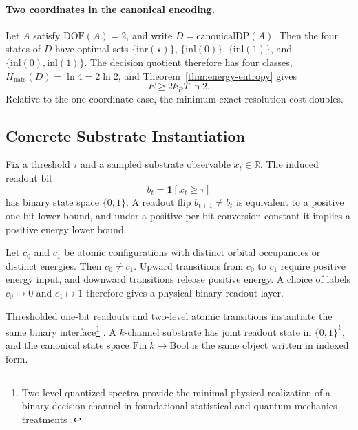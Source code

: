 \paragraph{Two coordinates in the canonical encoding.}
Let $A$ satisfy $\mathrm{DOF}(A)=2$, and write $D=\mathrm{canonicalDP}(A)$. Then the four states of $D$ have optimal sets $\{\mathrm{inr}(\star)\}$, $\{\mathrm{inl}(0)\}$, $\{\mathrm{inl}(1)\}$, and $\{\mathrm{inl}(0),\mathrm{inl}(1)\}$. The decision quotient therefore has four classes, $H_{\mathrm{nats}}(D)=\ln 4 = 2\ln 2$, and Theorem~\ref{thm:energy-entropy} gives
\[
E \ge 2 k_B T \ln 2.
\]
Relative to the one-coordinate case, the minimum exact-resolution cost doubles.

\subsection{Concrete Substrate Instantiation}

\begin{proposition}\label{prop:threshold-channel}
Fix a threshold $\tau$ and a sampled substrate observable $x_t \in \mathbb{R}$. The induced readout bit
\[
b_t = \mathbf{1}[x_t \ge \tau]
\]
has binary state space $\{0,1\}$. A readout flip $b_{t+1} \ne b_t$ is equivalent to a positive one-bit lower bound, and under a positive per-bit conversion constant it implies a positive energy lower bound.
\end{proposition}

\begin{proposition}\label{prop:atomic-realization}
Let $c_0$ and $c_1$ be atomic configurations with distinct orbital occupancies or distinct energies. Then $c_0 \ne c_1$. Upward transitions from $c_0$ to $c_1$ require positive energy input, and downward transitions release positive energy. A choice of labels $c_0 \mapsto 0$ and $c_1 \mapsto 1$ therefore gives a physical binary readout layer.
\end{proposition}

Thresholded one-bit readouts and two-level atomic transitions instantiate the same binary interface\footnote{Two-level quantized spectra provide the minimal physical realization of a binary decision channel in foundational statistical and quantum mechanics treatments \cite{planck1901distribution,dirac1930principles,sakurai2017modern}.} \cite{berut2012experimental}. A $k$-channel substrate has joint readout state in $\{0,1\}^k$, and the canonical state space $\mathrm{Fin}\;k \to \mathrm{Bool}$ is the same object written in indexed form.

